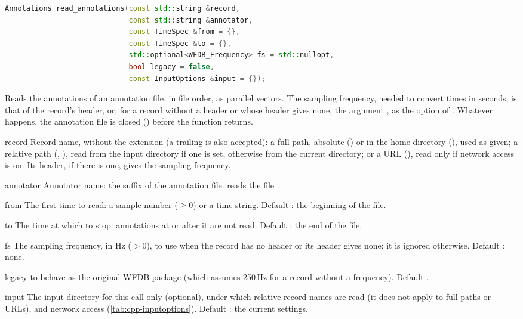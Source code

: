 \begin{lstlisting}[language=C++,style=signature]
Annotations read_annotations(const std::string &record,
                             const std::string &annotator,
                             const TimeSpec &from = {},
                             const TimeSpec &to = {},
                             std::optional<WFDB_Frequency> fs = std::nullopt,
                             bool legacy = false,
                             const InputOptions &input = {});
\end{lstlisting}
Reads the annotations of an annotation file, in file order, as parallel vectors. The
sampling frequency, needed to convert times in seconds, is that of the record's header,
or, for a record without a header or whose header gives none, the argument , as
the option  of . Whatever happens, the annotation file is closed
() before the function returns.
\begin{params}
\item[record] Record name, without the  extension (a trailing  is
  also accepted): a full path, absolute () or in the home
  directory (), used as given; a relative path
  (, ), read from the input directory if one is set,
  otherwise from the current directory; or a URL
  (), read only if network access is
  on. Its header, if there is one, gives the sampling frequency.
\item[annotator] Annotator name: the suffix of the annotation file.  reads the
  file .
\item[from] The first time to read: a sample number ($\geq 0$) or a time string. Default
  \code{\{\}}: the beginning of the file.
\item[to] The time at which to stop: annotations at or after it are not read. Default
  \code{\{\}}: the end of the file.
\item[fs] The sampling frequency, in Hz ($> 0$), to use when the record has no header or
  its header gives none; it is ignored otherwise. Default : none.
\item[legacy]  to behave as the original WFDB package (which assumes 250\,Hz
  for a record without a frequency). Default .
\item[input] The input directory for this call only (optional), under which relative
  record names are read (it does not apply to full paths or URLs), and network access
  (\cref{tab:cpp-inputoptions}). Default \code{\{\}}: the current settings.
\end{params}
